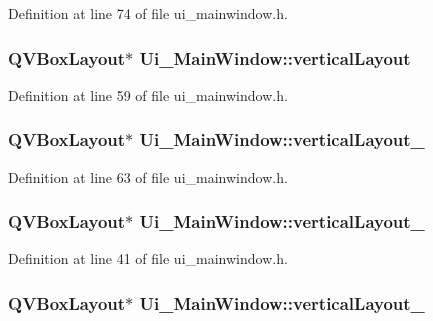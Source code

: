 Definition at line 74 of file ui\-\_\-mainwindow.\-h.

\hypertarget{class_ui___main_window_aecd96a04789fcfec3f98d80390ad8184}{
\subsubsection[{vertical\-Layout}]{\setlength{\rightskip}{0pt plus 5cm}Q\-V\-Box\-Layout$\ast$ Ui\-\_\-\-Main\-Window\-::vertical\-Layout}}\label{class_ui___main_window_aecd96a04789fcfec3f98d80390ad8184}


Definition at line 59 of file ui\-\_\-mainwindow.\-h.

\hypertarget{class_ui___main_window_a0c01bad60d9f422a1258e710635a2f65}{
\subsubsection[{vertical\-Layout\-\_\-2}]{\setlength{\rightskip}{0pt plus 5cm}Q\-V\-Box\-Layout$\ast$ Ui\-\_\-\-Main\-Window\-::vertical\-Layout\-\_}}\label{class_ui___main_window_a0c01bad60d9f422a1258e710635a2f65}


Definition at line 63 of file ui\-\_\-mainwindow.\-h.

\hypertarget{class_ui___main_window_a38b8a4b887f3b58e2a49e7905ae6f1f0}{
\subsubsection[{vertical\-Layout\-\_\-3}]{\setlength{\rightskip}{0pt plus 5cm}Q\-V\-Box\-Layout$\ast$ Ui\-\_\-\-Main\-Window\-::vertical\-Layout\-\_}}\label{class_ui___main_window_a38b8a4b887f3b58e2a49e7905ae6f1f0}


Definition at line 41 of file ui\-\_\-mainwindow.\-h.

\hypertarget{class_ui___main_window_a6f40fc110b15410c00837a446d57bdbe}{
\subsubsection[{vertical\-Layout\-\_\-4}]{\setlength{\rightskip}{0pt plus 5cm}Q\-V\-Box\-Layout$\ast$ Ui\-\_\-\-Main\-Window\-::vertical\-Layout\-\_}}\label{class_ui___main_window_a6f40fc110b15410c00837a446d57bdbe}


